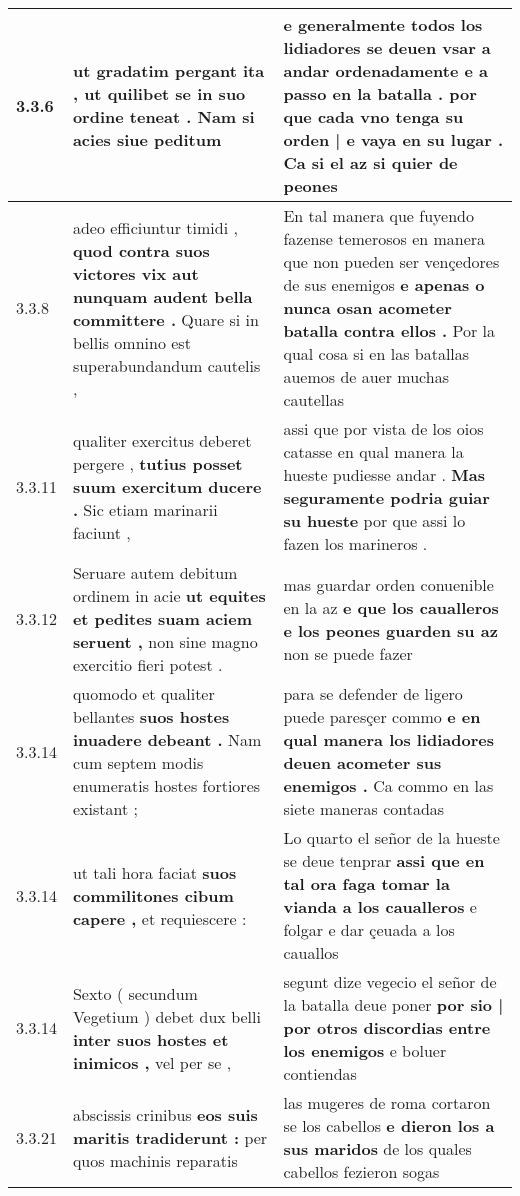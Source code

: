\begin{tabular}{|p{1cm}|p{6.5cm}|p{6.5cm}|}
3.3.6 & ut gradatim pergant ita , \textbf{ ut quilibet se in suo ordine teneat . } Nam si acies siue peditum & e generalmente todos los lidiadores se deuen vsar a andar ordenadamente e a passo en la batalla . \textbf{ por que cada vno tenga su orden | e vaya en su lugar . } Ca si el az si quier de peones \\\hline
3.3.8 & adeo efficiuntur timidi , \textbf{ quod contra suos victores vix aut nunquam audent bella committere . } Quare si in bellis omnino est superabundandum cautelis , & En tal manera que fuyendo fazense temerosos en manera que non pueden ser vençedores de sus enemigos \textbf{ e apenas o nunca osan acometer batalla contra ellos . } Por la qual cosa si en las batallas auemos de auer muchas cautellas \\\hline
3.3.11 & qualiter exercitus deberet pergere , \textbf{ tutius posset suum exercitum ducere . } Sic etiam marinarii faciunt , & assi que por vista de los oios catasse en qual manera la hueste pudiesse andar . \textbf{ Mas seguramente podria guiar su hueste } por que assi lo fazen los marineros . \\\hline
3.3.12 & Seruare autem debitum ordinem in acie \textbf{ ut equites et pedites suam aciem seruent , } non sine magno exercitio fieri potest . & mas guardar orden conuenible en la az \textbf{ e que los caualleros e los peones guarden su az } non se puede fazer \\\hline
3.3.14 & quomodo et qualiter bellantes \textbf{ suos hostes inuadere debeant . } Nam cum septem modis enumeratis hostes fortiores existant ; & para se defender de ligero puede paresçer commo \textbf{ e en qual manera los lidiadores deuen acometer sus enemigos . } Ca commo en las siete maneras contadas \\\hline
3.3.14 & ut tali hora faciat \textbf{ suos commilitones cibum capere , } et requiescere : & Lo quarto el señor de la hueste se deue tenprar \textbf{ assi que en tal ora faga tomar la vianda a los caualleros } e folgar e dar çeuada a los cauallos \\\hline
3.3.14 & Sexto ( secundum Vegetium ) debet dux belli \textbf{ inter suos hostes et inimicos , } vel per se , & segunt dize vegecio el señor de la batalla deue poner \textbf{ por sio | por otros discordias entre los enemigos } e boluer contiendas \\\hline
3.3.21 & abscissis crinibus \textbf{ eos suis maritis tradiderunt : } per quos machinis reparatis & las mugeres de roma cortaron se los cabellos \textbf{ e dieron los a sus maridos } de los quales cabellos fezieron sogas \\\hline

\end{tabular}
